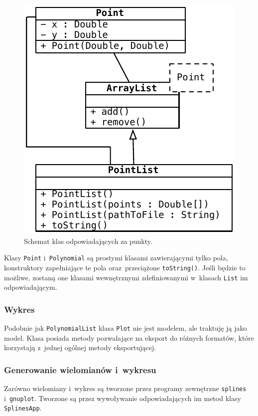 \documentclass[10pt,a4paper]{article}
\newcommand{\f}[1]{\texttt{#1}}
\begin{document}
\begin{figure}[ht]
  \centering
  \includegraphics{figury/punkty-szczegolowo}
  \caption{Schemat klas odpowiadających za punkty.}
  \label{fig:punkty-szczegolowo}
\end{figure}

Klasy \f{Point} i~\f{Polynomial} są prostymi klasami zawierającymi tylko pola,
konstruktory zapełniające te pola oraz~przeciążone \f{toString()}. Jeśli będzie
to możliwe, zostaną one klasami wewnętrznymi zdefiniowanymi w~klasach \f{List}
im odpowiadającym.

\subsubsection{Wykres}

Podobnie jak \f{PolynomialList} klasa \f{Plot} nie jest modelem, ale traktuję
ją jako model. Klasa posiada metody pozwalające na eksport do różnych formatów,
które korzystają z~jednej ogólnej metody eksportującej.

\subsubsection{Generowanie wielomianów i~wykresu}

Zarówno wielomiany i~wykres są tworzone przez programy zewnętrzne \f{splines}
i~\f{gnuplot}. Tworzone są przez wywoływanie odpowiadających im metod klasy
\f{SplinesApp}.
\end{document}
